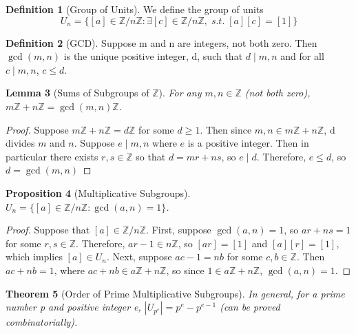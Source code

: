\documentclass[12pt]{article}
\newtheorem{thm}{Theorem}[section]
\newtheorem{lem}[thm]{Lemma}  %
\newtheorem{prop}[thm]{Proposition}
\theoremstyle{definition}
\newtheorem{defn}[thm]{Definition}
\theoremstyle{remark}
\numberwithin{equation}{section}
\newcommand\Z{\mathbb Z}    %
\begin{document}
\vspace{15pt}

\begin{defn}[Group of Units]
        We define the group of units \begin{equation}
                U_n = \{[a] \in \Z/n\Z : \exists [c] \in \Z/n\Z,\;s.t.\;[a][c] = [1]\}
        \end{equation}
\end{defn}


\vspace{15pt}

\begin{defn}[GCD]
        Suppose m and n are integers, not both zero. Then $\gcd(m,n)$ is the unique positive integer, d, such that $d\;\vert\;m,n$ and for all $c\;\vert\;m,n$, $c \leq d$.
\end{defn}

\vspace{15pt}

\begin{lem}[Sums of Subgroups of $\Z$]
        For any $m,n \in \Z$ (not both zero), $m\Z+n\Z = \gcd(m,n)\Z$.
\end{lem}
\begin{proof}
        Suppose $m\Z + n\Z = d\Z$ for some $d \geq 1$. Then since $m,n \in m\Z + n\Z$, d divides $m$ and $n$. Suppose $e\;\vert\;m,n$ where $e$ is a positive integer. Then in particular there exists $r,s \in \Z$ so that $d = mr + ns$, so $e\;\vert\;d$. Therefore, $e \leq d$, so $d = \gcd(m,n)$
\end{proof}

\vspace{15pt}

\begin{prop}[Multiplicative Subgroups]
        $U_n = \{[a] \in \Z/n\Z: \gcd(a,n) = 1\}$.
\end{prop}

\begin{proof}
        Suppose that $[a] \in \Z/n\Z$. First, suppose $\gcd(a,n) = 1$, so $ar + ns = 1$ for some $r,s \in \Z$. Therefore, $ar - 1 \in n\Z$, so $[ar] = [1]$ and $[a][r]=[1]$, which implies $[a] \in U_n$. Next, suppose $ac - 1 = nb$ for some $c,b \in \Z$. Then $ac + nb = 1$, where $ac + nb \in a\Z + n\Z$, so since $1 \in a\Z + n\Z$, $\gcd(a,n) = 1$.
\end{proof}


\vspace{15pt}

\begin{thm}[Order of Prime Multiplicative Subgroups]
        In general, for a prime number p and positive integer e, $|U_{p^e}| = p^e - p^{e-1}$ (can be proved combinatorially).
\end{thm}
\end{document}
